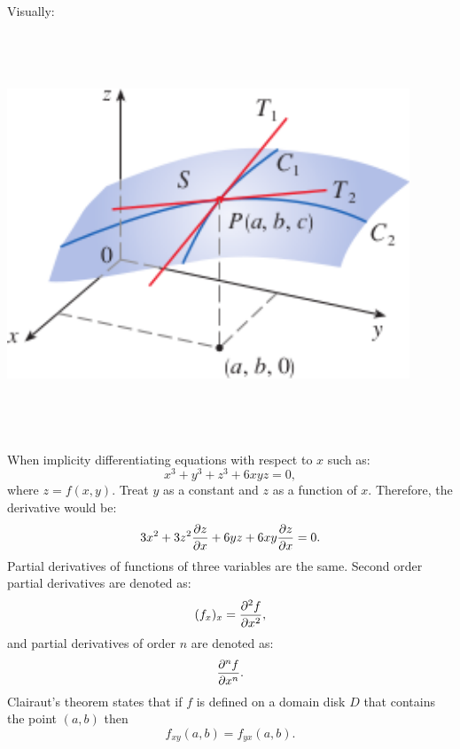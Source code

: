 \documentclass{article}
\begin{document}
\noindent Visually: 
\begin{center}
    \includegraphics[width=12cm,height=12cm, keepaspectratio]{PartialDerivative.png}
\end{center}

When implicity differentiating equations with respect to $x$ such as:
\[x^3 + y^3 + z^3 + 6xyz = 0,\] where $z = f(x,y)$. Treat $y$ as a constant and $z$
as a function of $x$. Therefore, the derivative would be:
\[3x^2 + 3z^2\pdv{z}{x} + 6yz + 6xy\pdv{z}{x} = 0.\]
Partial derivatives of functions of three variables are the same. Second order
partial derivatives are denoted as:
\[(f_x)_x = \pdv[2]{f}{x},\]
and partial derivatives of order $n$ are denoted as:
\[\pdv[n]{f}{x}.\]
Clairaut's theorem states that if $f$ is defined on a domain disk $D$ that contains
the point $(a,b)$ then
\[f_{xy}(a,b) = f_{yx}(a,b).\]
\end{document}
